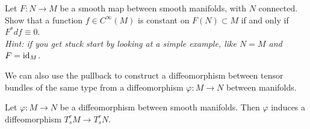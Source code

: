 \begin{exercise}
	Let $F:N\to M$ be a smooth map between smooth manifolds, with $N$ connected.
	Show that a function $f\in C^\infty(M)$ is constant on $F(N)\subset M$ if and only if $F^* df \equiv 0$.\\
	\textit{\small Hint: if you get stuck start by looking at a simple example, like $N=M$ and $F=\operatorname{id}_M$.}
\end{exercise}

We can also use the pullback to construct a diffeomorphism between tensor bundles of the same type from a diffeomorphism $\varphi:M\to N$ between manifolds.

\begin{proposition}
	Let $\varphi:M\to N$ be a diffeomorphism between smooth manifolds.
	Then $\varphi$ induces a diffeomorphism $T_s^rM \to T_s^r N$.
\end{proposition}
